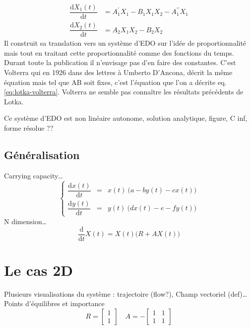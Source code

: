\documentclass{wsdcr}
\begin{document}
\begin{equation}
\begin{aligned}
{\dfrac {\mathrm {d} X_1(t)}{\mathrm {d} t}}&=A_1^\prime X_1-B_1X_1X_2-A_1^{\prime \prime}X_1\\
{\dfrac {\mathrm {d} X_2(t)}{\mathrm {d} t}}&=A_2X_1X_2-B_2X_2
\end{aligned}
\end{equation}
Il construit sa translation vers un système d'EDO sur l'idée de proportionnalité mais tout en traitant cette proportionnalité comme des fonctions du temps. Durant toute la publication il n'envisage pas d'en faire des constantes. C'est Volterra qui en 1926 dans des lettres à Umberto D'Ancona, décrit la même équation mais tel que AB soit fixes, c'est l'équation que l'on a décrite eq.\ref{eq:lotka-volterra}. Volterra ne semble pas connaître les résultats précédents de Lotka. \cite{volterra1926}

Ce système d'EDO est non linéaire autonome, solution analytique, figure, C inf, forme résolue ??

\subsection{Généralisation}
Carrying capacity…
\begin{equation}
\left\{
{\begin{array}{ccc}{\dfrac {\mathrm {d} x(t)}{\mathrm {d} t}}&=&x(t)\ {\Big (}a -b y(t)-c x(t){\Big )}\\{\dfrac {\mathrm {d} y(t)}{\mathrm {d} t}}&=&y(t)\ {\Big (}d x(t)-e -f y(t) {\Big )}\end{array}}
\right.
\end{equation}
N dimension…
\begin{equation}
\dfrac {\mathrm {d}}{\mathrm {d} t}X(t)=X(t) {\Big (}R+AX(t){\Big )}
\end{equation}
\section{Le cas 2D}
Plusieurs visualisations du système : trajectoire (flow?), Champ vectoriel (def)…
Points d'équilibres et importance
\begin{equation}
R={\begin{bmatrix}1\\1\end{bmatrix}}\quad A =-{\begin{bmatrix}1&1\\1&1\end{bmatrix}}
\label{eq:RSnInv}
\end{equation}
\end{document}
